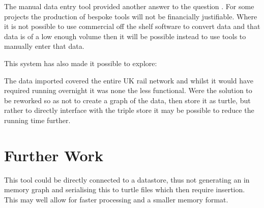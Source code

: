 The manual data entry tool provided another answer to the question \say{\QuestionOtherData}. For some projects the production of bespoke tools will not be financially justifiable. Where it is not possible to use commercial off the shelf software to convert data and that data is of a low enough volume then it will be possible instead to use tools to manually enter that data.

This system has also made it possible to explore: \textit{\QuestionCanOntologyScale}

The data imported covered the entire UK rail network and whilst it would have required running overnight it was none the less functional. Were the solution to be reworked so as not to create a graph of the data, then store it as turtle, but rather to directly interface with the triple store it may be possible to reduce the running time further.

\section{Further Work}
This tool could be directly connected to a datastore, thus not generating an in memory graph and serialising this to turtle files which then require insertion. This may well allow for faster processing and a smaller memory format. 